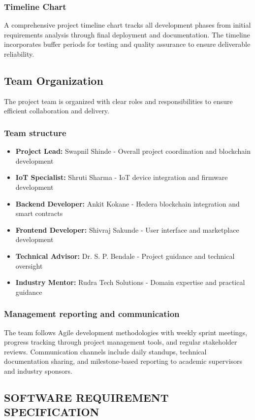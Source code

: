 \documentclass[oneside,a4paper,12pt]{book}
\begin{document}
\subsection{Timeline Chart}  
A comprehensive project timeline chart tracks all development phases from initial requirements analysis through final deployment and documentation. The timeline incorporates buffer periods for testing and quality assurance to ensure deliverable reliability.

\section{Team Organization}
The project team is organized with clear roles and responsibilities to ensure efficient collaboration and delivery.

\subsection{Team structure}
\begin{itemize}
\item \textbf{Project Lead:} Swapnil Shinde - Overall project coordination and blockchain development
\item \textbf{IoT Specialist:} Shruti Sharma - IoT device integration and firmware development  
\item \textbf{Backend Developer:} Ankit Kokane - Hedera blockchain integration and smart contracts
\item \textbf{Frontend Developer:} Shivraj Sakunde - User interface and marketplace development
\item \textbf{Technical Advisor:} Dr. S. P. Bendale - Project guidance and technical oversight
\item \textbf{Industry Mentor:} Rudra Tech Solutions - Domain expertise and practical guidance
\end{itemize}

\subsection{Management reporting and communication}
The team follows Agile development methodologies with weekly sprint meetings, progress tracking through project management tools, and regular stakeholder reviews. Communication channels include daily standups, technical documentation sharing, and milestone-based reporting to academic supervisors and industry sponsors.

\begin{center}
\chapter{SOFTWARE REQUIREMENT SPECIFICATION}
\end{center}
\clearpage
\end{document}
